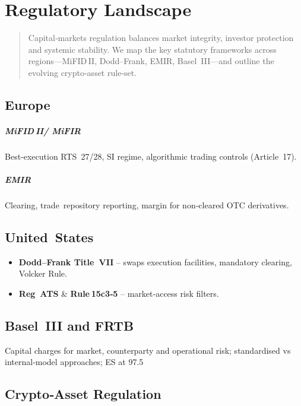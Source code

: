 \chapter{Regulatory Landscape}\label{ch:regland}

\begin{abstract}
Capital‑markets regulation balances market integrity, investor
protection and systemic stability.  We map the key statutory frameworks
across regions—MiFID II, Dodd–Frank, EMIR, Basel III—and outline the
evolving crypto‑asset rule‑set.
\end{abstract}

\section{Europe}

\paragraph{MiFID II/ MiFIR}  
Best‑execution RTS 27/28, SI regime, algorithmic trading controls
(Article 17).

\paragraph{EMIR}  
Clearing, trade repository reporting, margin for non‑cleared OTC
derivatives.

\section{United States}

\begin{itemize}
  \item \textbf{Dodd–Frank Title VII} – swaps execution facilities,
        mandatory clearing, Volcker Rule.
  \item \textbf{Reg ATS} & \textbf{Rule 15c3‑5} – market‑access risk filters.
\end{itemize}

\section{Basel III and FRTB}

Capital charges for market, counterparty and operational risk;
standardised vs internal‑model approaches; ES at 97.5 %

\section{Crypto‑Asset Regulation}

